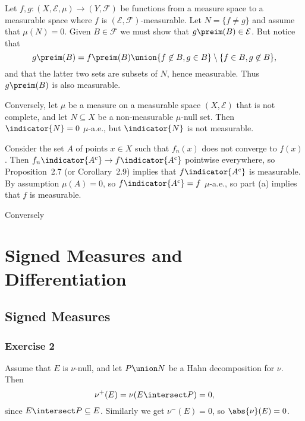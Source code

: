 \documentclass[article, a4paper, 11pt, oneside]{memoir}
\numberwithin{equation}{chapter}
\newcommand{\calE}{\mathcal{E}}
\newcommand{\calF}{\mathcal{F}}
\begin{document}
\begin{solution}
    \item Let $f,g \colon (X,\calE,\mu) \to (Y,\calF)$ be functions from a measure space to a measurable space where $f$ is $(\calE,\calF)$-measurable. Let $N = \{f \neq g\}$ and assume that $\mu(N) = 0$. Given $B \in \calF$ we must show that $g\preim(B) \in \calE$. But notice that
    \begin{equation*}
        g\preim(B)
            = f\preim(B) \union \{ f \not\in B, g \in B \} \setminus \{ f \in B, g \not\in B \},
    \end{equation*}
    and that the latter two sets are subsets of $N$, hence measurable. Thus $g\preim(B)$ is also measurable.

    Conversely, let $\mu$ be a measure on a measurable space $(X,\calE)$ that is not complete, and let $N \subseteq X$ be a non-measurable $\mu$-null set. Then $\indicator{N} = 0$ $\mu$-a.e., but $\indicator{N}$ is not measurable.

    \item Consider the set $A$ of points $x \in X$ such that $f_n(x)$ does not converge to $f(x)$. Then $f_n \indicator{A^c} \to f \indicator{A^c}$ pointwise everywhere, so Proposition~2.7 (or Corollary~2.9) implies that $f \indicator{A^c}$ is measurable. By assumption $\mu(A) = 0$, so $f \indicator{A^c} = f$ $\mu$-a.e., so part (a) implies that $f$ is measurable.
    
    Conversely
\end{solution}


\chapter{Signed Measures and Differentiation}

\section{Signed Measures}

\subsection{Exercise 2}

Assume that $E$ is $\nu$-null, and let $P \union N$ be a Hahn decomposition for $\nu$. Then
%
\begin{equation*}
	\nu^+(E) = \nu(E \intersect P) = 0,
\end{equation*}
%
since $E \intersect P \subseteq E$. Similarly we get $\nu^-(E) = 0$, so $\abs{\nu}(E) = 0$.
\end{document}
